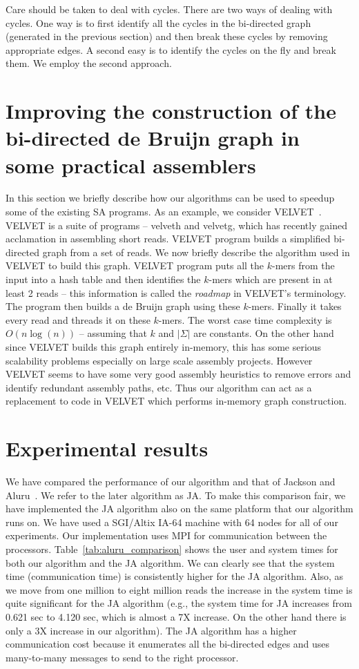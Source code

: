 \documentclass[11pt,conference,twocolumn]{IEEEtran}
\begin{document}
Care should be taken to deal with cycles. There are two ways of dealing with cycles. One way is to first identify
all the cycles in the bi-directed graph (generated in the previous section) and then break these cycles by removing
appropriate edges. A second easy is to identify the cycles on the fly and break them. We employ the second
approach. 

\section{Improving the construction of the bi-directed de Bruijn graph in some 
practical assemblers}
\label{sec:velvet}
In this section we briefly describe how our algorithms can be used to speedup some of the
existing SA programs. As an example, we consider {VELVET}~\cite{velvet08}. VELVET is a suite of 
programs -- {\sf velveth} and {\sf velvetg}, which has recently gained acclamation in assembling 
short reads. VELVET program builds a simplified bi-directed graph from a set of reads. We now
briefly describe the algorithm used in VELVET to build this graph. VELVET program puts all the 
$k$-mers from the input into a hash table and then identifies the $k$-mers which are present 
in at least 2 reads -- this information is called the {\em roadmap} in VELVET's terminology.  
The program then builds a de Bruijn graph using these $k$-mers. Finally it takes every read 
and threads it on these $k$-mers. The worst case time complexity is $O(n\log(n))$ -- assuming 
that $k$ and $|\Sigma|$ are constants. On the other hand since VELVET
builds this graph entirely in-memory, this has some serious scalability problems especially on 
large scale assembly projects. However VELVET seems to have some very good assembly 
heuristics to remove errors and identify redundant assembly paths, etc. Thus our algorithm can 
act as a replacement to code in VELVET which performs in-memory graph construction. 



\section{Experimental results}
\label{sec:exp_results}
We have compared the performance of our algorithm and that of Jackson and Aluru~\cite{par_bidirected_graph}.
We refer to the later algorithm as JA.
To make this comparison fair, we have implemented the JA algorithm also on the same platform that
our algorithm runs on.
We have used a SGI/Altix IA-64 machine with 64 nodes for all of our experiments. 
Our implementation uses MPI for communication between the processors. Table~\ref{tab:aluru_comparison} 
shows the user and system times for both our algorithm and the JA algorithm. We can clearly see 
that the system time (communication time) is consistently higher for the JA algorithm. Also, as we move from 
one million to eight million reads the increase in the system time is quite significant for the JA
algorithm (e.g., the system time for JA increases from 0.621 sec to 4.120 sec, which
is almost a 7X increase. On the other hand there is only a 3X increase in our algorithm). The JA
algorithm has a higher communication cost because it enumerates all the bi-directed edges and uses 
many-to-many messages to send to the right processor. 
\end{document}
